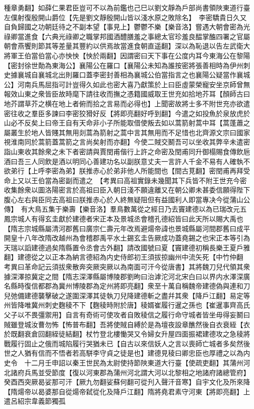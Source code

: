 種章勇翻】如薛仁果君臣豈可不以為前鑑也己巳以劉文靜為戶部尚書領陜東道行臺左僕射復殷開山爵位【先是劉文靜殷開山皆以淺水原之敗除名】　李密驕貴日久又自負歸國之功朝廷待之不副本望【事見上】鬱鬱不樂【樂音洛】嘗遇大朝會密為光祿卿當進食【六典光祿卿之職掌邦國酒醴膳羞之事總太官珍羞良醖掌醢四署之官屬朝會燕饗則節其等差量其豐約以供焉故當進食朝直遥翻】深以為恥退以告左武衛大將軍王伯當伯當心亦怏怏【怏於兩翻】因謂密曰天下事在公度内耳今東海公在黎陽【密封徐世勣為東海公】襄陽公在羅口【襄陽公未知為誰按密將張善相時為伊州刺史據襄城自襄城北出則羅口蓋李密封善相為襄城公伯當指言之也襄陽公疑當作襄城公】河南兵馬屈指可計豈得久如此也密大喜乃獻策於上曰臣虛蒙榮寵安坐京師曾無報效山東之衆皆臣故時麾下請往收而撫之憑籍國威取王世充如拾地芥耳【顏師古曰地芥謂草芥之横在地上者俯而拾之言易而必得也】上聞密故將士多不附世充亦欲遣密往收之羣臣多諫曰李密狡猾好反【將即亮翻好呼到翻】今遣之如投魚於泉放虎於山必不反矣上曰帝王自有天命非小子所能取借使叛去如以蒿箭射蒿中耳【蒿蓬蕭之屬叢生於地人皆賤其無用剡蒿為箭射之蒿中言其無用而不足惜也北齊源文宗曰國家視淮南同於蒿箭蓋蒿箭之言尚矣射而亦翻】今使二賊交鬭吾可以坐收其弊辛未遣密詣山東收其餘衆之未下者密請與賈閏甫偕行上許之命密及閏甫同升御榻賜食傳飲巵酒曰吾三人同飲是酒以明同心善建功名以副朕意丈夫一言許人千金不易有人確執不欲弟行【上呼李密為弟】朕推赤心於弟非他人所能間也【間古莧翻】密閏甫再拜受命上又以王伯當為密副而遣之　【考異曰高祖實錄未幾聞其下兵皆不附王世充今密收集餘衆以圖洛陽密言於高祖曰臣入朝日淺不願違離又在朝公卿未甚委信願得陛下腹心左右與臣同去高祖曰朕推赤心於人終無疑阻但有益國利人即當專决今從蒲山公傳】　有大鳥五集于樂壽【樂音洛】羣鳥數萬從之經日乃去竇建德以為已瑞改元五鳳宗城人有得玄圭獻於建德者宋正本及景城丞會稽孔德紹皆曰此天所以賜大禹也【隋志宗城縣屬清河郡舊曰廣宗仁壽元年改焉避煬帝諱也景城縣屬河間郡舊曰成平開皇十八年改隋改越州為會稽郡禹平水土錫玄圭告厥成功蓋堯錫之也宋正本等引為天瑞以謟建德過矣隋縣置令丞會古外翻】請改國號曰夏【竇建德初稱長樂王夏戶雅翻】建德從之以正本為納言德紹為内史侍郎初王須拔掠幽州中流矢死【中竹仲翻　考異曰革命記云須拔衆散奔突厥突厥以為南面可汗今從唐書】其將魏刀兒代領其衆據深澤掠冀定之間【隋志深澤縣屬博陵郡劉昫曰治滹沱河北宋白曰以界内水澤深廣名縣時復信都郡為冀州博陵郡為定州將即亮翻】衆至十萬自稱魏帝建德偽與連和刀兒弛備建德襲擊破之遂圍深澤其徒執刀兒降建德斬之盡幷其衆【降戶江翻】易定等州皆降唯冀州刺史麴稜不下【麴稜時附於唐】稜婿崔履行暹之孫也【崔暹事齊高氏父子以不畏彊禦用】自言有奇術可使攻者自敗稜信之履行命守城者皆坐毋得妄鬭曰賊雖登城汝曹勿怖【怖普布翻】吾將使賊自縛於是為壇夜設章醮然後自衣衰絰【衣於既翻衰倉回翻絰徒結翻】杖竹登北樓慟哭又令婦女升屋四面振裙建德攻之急稜將戰履行固止之俄而城陷履行哭猶未已【自古以來信妖人之言以喪師亡城者多矣然後世之人猶有信而不悟者若高駢李守貞之徒是也】建德見稜曰卿忠臣也厚禮之以為内史令　十二月壬申詔以秦王世民為太尉使持節陜東道大行臺【使疏吏翻】其蒲州河北諸府兵馬並受節度【復以河東郡為蒲州河北謂大河以北黎相之地諸府諸總管府】　癸酉西突厥曷娑那可汗【厥九勿翻娑蘇何翻可從刋入聲汗音寒】自宇文化及所來降【隋煬帝以曷婆那自從煬帝弑從化及降戶江翻】隋將堯君素守河東【將即亮翻】上遣呂紹宗韋義節獨孤

